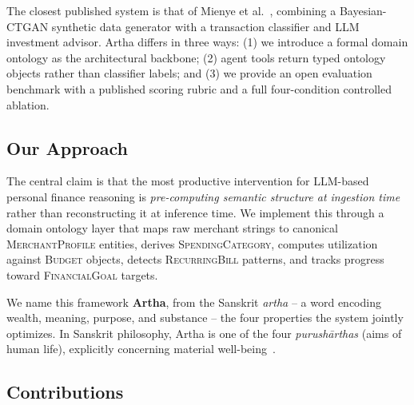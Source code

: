 \documentclass[conference]{IEEEtran}
\begin{document}
The closest published system is that of Mienye et
al.~\cite{mienye2026}, combining a Bayesian-CTGAN synthetic data
generator with a transaction classifier and LLM investment advisor.
Artha differs in three ways: (1) we introduce a formal domain
ontology as the architectural backbone; (2) agent tools return
typed ontology objects rather than classifier labels; and (3) we
provide an open evaluation benchmark with a published scoring
rubric and a full four-condition controlled ablation.

\subsection{Our Approach}

The central claim is that the most productive intervention for
LLM-based personal finance reasoning is \emph{pre-computing
semantic structure at ingestion time} rather than reconstructing it
at inference time. We implement this through a domain ontology
layer that maps raw merchant strings to canonical
\textsc{MerchantProfile} entities, derives
\textsc{SpendingCategory}, computes utilization against
\textsc{Budget} objects, detects \textsc{RecurringBill} patterns,
and tracks progress toward \textsc{FinancialGoal} targets.

We name this framework \textbf{Artha}, from the Sanskrit
\emph{artha} -- a word encoding wealth, meaning, purpose, and
substance -- the four properties the system jointly optimizes. In
Sanskrit philosophy, Artha is one of the four \emph{purush\=arthas}
(aims of human life), explicitly concerning material
well-being~\cite{kautilya_arthashastra}.

\subsection{Contributions}
\end{document}
